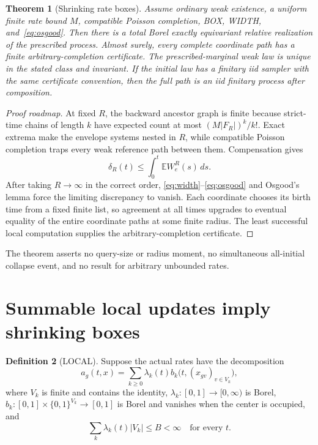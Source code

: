\documentclass[11pt]{article}
\newtheorem{theorem}{Theorem}[section]
\theoremstyle{definition}
\newtheorem{definition}[theorem]{Definition}
\theoremstyle{remark}
\newcommand{\E}{\mathbb{E}}
\newcommand{\1}{\mathbf{1}}
\begin{document}
\begin{theorem}[Shrinking rate boxes]
Assume ordinary weak existence, a uniform finite rate bound $M$, compatible
Poisson completion, BOX, WIDTH, and~\eqref{eq:osgood}.  Then there is a total
Borel exactly equivariant relative realization of the prescribed process.
Almost surely, every complete coordinate path has a finite
arbitrary-completion certificate.  The prescribed-marginal weak law is unique
in the stated class and invariant.  If the initial law has a finitary iid
sampler with the same certificate convention, then the full path is an iid
finitary process after composition.
\end{theorem}

\begin{proof}[Proof roadmap]
At fixed $R$, the backward ancestor graph is finite because strict-time chains
of length $k$ have expected count at most $(M|F_R|)^k/k!$.  Exact extrema make
the envelope systems nested in $R$, while compatible Poisson completion traps
every weak reference path between them.  Compensation gives
\[
 \delta_R(t)\le\int_0^t\E W_e^R(s)\,ds.
\]
After taking $R\to\infty$ in the correct order,
\eqref{eq:width}--\eqref{eq:osgood} and Osgood's lemma force the limiting
discrepancy to vanish.  Each coordinate chooses its birth time from a fixed
finite list, so agreement at all times upgrades to eventual equality of the
entire coordinate paths at some finite radius.  The least successful local
computation supplies the arbitrary-completion certificate.
\end{proof}

The theorem asserts no query-size or radius moment, no simultaneous
all-initial collapse event, and no result for arbitrary unbounded rates.

\section{Summable local updates imply shrinking boxes}

\begin{definition}[LOCAL]
Suppose the actual rates have the decomposition
\begin{equation}
 a_g(t,x)=\sum_{k\ge0}\lambda_k(t)
 b_k\bigl(t,(x_{gv})_{v\in V_k}\bigr),
 \label{eq:local}
\end{equation}
where $V_k$ is finite and contains the identity,
$\lambda_k:[0,1]\to[0,\infty)$ is Borel,
$b_k:[0,1]\times\{0,1\}^{V_k}\to[0,1]$ is Borel and vanishes when the
center is occupied, and
\begin{equation}
 \sum_k\lambda_k(t)|V_k|\le B<\infty
 \quad\text{for every }t.
 \label{eq:budget}
\end{equation}
\end{definition}
\end{document}
